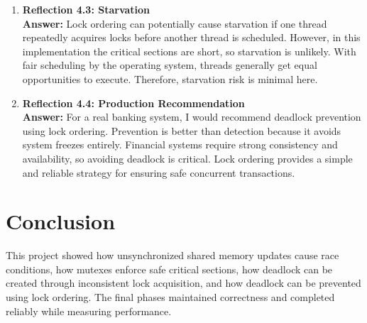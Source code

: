 \documentclass[12pt]{article}
\begin{document}
\begin{enumerate}
\item \textbf{Reflection 4.3: Starvation} \\
\textbf{Answer:} Lock ordering can potentially cause starvation if one thread repeatedly acquires locks before another thread is scheduled.
 However, in this implementation the critical sections are short, so starvation is unlikely. With fair scheduling by the operating system, threads
 generally get equal opportunities to execute. Therefore, starvation risk is minimal here.

\item \textbf{Reflection 4.4: Production Recommendation} \\
\textbf{Answer:} For a real banking system, I would recommend deadlock prevention using lock ordering. Prevention is better than detection
 because it avoids system freezes entirely. Financial systems require strong consistency and availability, so avoiding deadlock is critical. Lock
 ordering provides a simple and reliable strategy for ensuring safe concurrent transactions.
\end{enumerate}

\section{Conclusion}
This project showed how unsynchronized shared memory updates cause race conditions,
how mutexes enforce safe critical sections, how deadlock can be created through inconsistent
lock acquisition, and how deadlock can be prevented using lock ordering. The final phases
maintained correctness and completed reliably while measuring performance.
\end{document}
